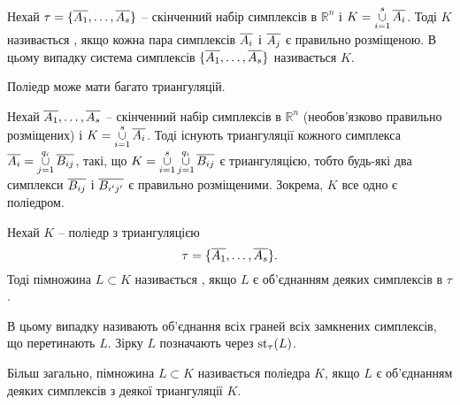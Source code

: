 \begin{definition}[Поліедр]
Нехай $\tau = \{\overline{A_1},\ldots,\overline{A_s}\}$ -- скінченний набір симплексів в $\mathbb{R}^n$ і $K = \mathop{\cup}\limits_{i=1}^{s}\overline{A_i}$.
Тоді $K$ називається , якщо кожна пара симплексів $\overline{A_i}$ і $\overline{A_j}$ є правильно розміщеною.
В цьому випадку система симплексів $\{ \overline{A_1},\ldots,\overline{A_s} \}$ називається  $K$.
\end{definition}

Поліедр може мати багато триангуляцій.

\begin{lemma}
Нехай $\overline{A_1},\ldots,\overline{A_s}$ -- скінченний набір симплексів в $\mathbb{R}^n$ (необов'язково правильно розміщених) і $K = \mathop{\cup}\limits_{i=1}^{s}\overline{A_i}$.
Тоді існують триангуляції кожного симплекса $\overline{A_i} = \mathop{\cup}\limits_{j=1}^{q_i}\overline{B_{ij}}$, такі, що $K = \mathop{\cup}\limits_{i=1}^{s}\mathop{\cup}\limits_{j=1}^{q_i}\overline{B_{ij}}$ є триангуляцією, тобто будь-які два симплекси $\overline{B_{ij}}$ і $\overline{B_{i'j'}}$ є правильно розміщеними.
Зокрема, $K$ все одно є поліедром.
\end{lemma}

\begin{definition}[Підполіедр]
Нехай $K$ -- поліедр з триангуляцією \[ \tau = \{\overline{A_1},\ldots,\overline{A_s}\}. \]
Тоді пімножина $L \subset K$ називається , якщо $L$ є об'єднанням деяких симплексів в $\tau$.

В цьому випадку  називають об'єднання всіх граней всіх замкнених симплексів, що перетинають $L$.
Зірку $L$ позначають через $\mathrm{st}_{\tau}(L)$.

Більш загально, пімножина $L \subset K$ називається  поліедра $K$, якщо $L$ є об'єднанням деяких симплексів з деякої триангуляції $K$.
\end{definition}


\begin{definition}
\end{definition}

\begin{definition}
\end{definition}

\begin{definition}
\end{definition}

